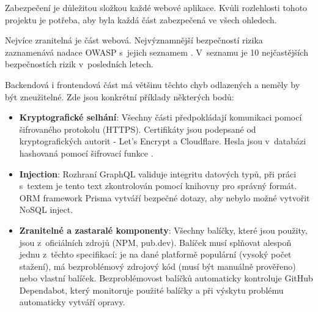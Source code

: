 Zabezpečení je důležitou složkou každé webové aplikace. Kvůli rozlehlosti tohoto projektu je potřeba, aby byla každá část zabezpečená ve všech ohledech.\par
Nejvíce zranitelná je část webová. Nejvýznamnější bezpečností rizika zaznamenává nadace OWASP\cite{OWASP} s~jejich seznamem \cite{OWASP-top-ten}. V~seznamu je 10 nejčastějších bezpečnostích rizik v~posledních letech.\par
Backendová i frontendová část má většinu těchto chyb odlazených a neměly by být zneužitelné. Zde jsou konkrétní příklady některých bodů:
\begin{itemize}
	\item \textbf{Kryptografické selhání}\cite{CryptographicFailures}: Všechny části předpokládají komunikaci pomocí šifrovaného protokolu (HTTPS). Certifikáty jsou podepsané od kryptografických autorit - Let's Encrypt a Cloudflare. Hesla jsou v~databázi hashovaná pomocí šifrovací funkce \cite{bcrypt}.
	\item \textbf{Injection}\cite{Injection}: Rozhraní GraphQL validuje integritu datových typů, při práci s~textem je tento text zkontrolován pomocí knihovny \cite{Validator} pro správný formát. ORM framework Prisma vytváří bezpečné dotazy, aby nebylo možné vytvořit NoSQL inject.
	\item \textbf{Zranitelné a zastaralé komponenty}\cite{VulnerableAndOutdatedComponents}: Všechny balíčky, které jsou použity, jsou z~oficiálních zdrojů (NPM, pub.dev). Balíček musí splňovat alespoň jednu z~těchto specifikací: je na dané platformě populární (vysoký počet stažení), má bezproblémový zdrojový kód (musí být manuálně prověřeno) nebo vlastní balíček. Bezproblémovost balíčků automaticky kontroluje GitHub Dependabot, který monitoruje použité balíčky a při výskytu problému automaticky vytváří opravy.
\end{itemize}
